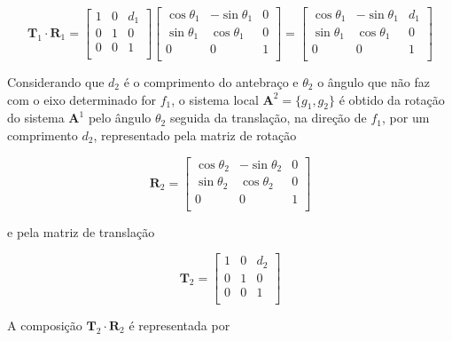 \[
	\mathbf{T}_1\cdot\mathbf{R}_1 = \begin{bmatrix}
		1 & 0 & d_1 \\
		0 & 1 & 0   \\
		0 & 0 & 1   \\
	\end{bmatrix}
	\begin{bmatrix}
		\cos\theta_1 & -\sin\theta_1 & 0 \\
		\sin\theta_1 & \cos\theta_1  & 0 \\
		0            & 0             & 1 \\
	\end{bmatrix}
	=
	\begin{bmatrix}
		\cos\theta_1 & -\sin\theta_1 & d_1 \\
		\sin\theta_1 & \cos\theta_1  & 0   \\
		0            & 0             & 1   \\
	\end{bmatrix}
\]

Considerando que $d_2$ é o comprimento do antebraço e $\theta_2$ o ângulo que não faz com o eixo determinado for $f_1$, o sistema local $\mathbf{A}^2 = \{g_1, g_2\}$ é obtido da rotação do sistema $\mathbf{A}^1$ pelo ângulo $\theta_2$ seguida da translação, na direção de $f_1$, por um comprimento $d_2$, representado pela matriz de rotação

\[
	\mathbf{R}_2 = \begin{bmatrix}
		\cos\theta_2 & -\sin\theta_2 & 0 \\
		\sin\theta_2 & \cos\theta_2  & 0 \\
		0            & 0             & 1 \\
	\end{bmatrix}
\]

\noindent e pela matriz de translação

\[
	\mathbf{T}_2 = \begin{bmatrix}
		1 & 0 & d_2 \\
		0 & 1 & 0   \\
		0 & 0 & 1   \\
	\end{bmatrix}
\]

A composição $\mathbf{T}_2\cdot\mathbf{R}_2$ é representada por

